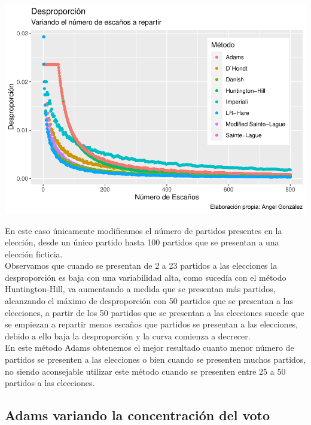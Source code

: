 \documentclass[12pt,a4paper,]{book}
\numberwithin{dummy}{section}
\theoremstyle{ocrenumbox}
\theoremstyle{blacknumex}
\theoremstyle{blacknumbox}
\theoremstyle{ocrenum}
\theoremstyle{ocrenum}
\begin{document}
\begin{center}\includegraphics[width=0.95\linewidth]{figurasR/unnamed-chunk-44-1} \end{center}

En este caso únicamente modificamos el número de partidos presentes en
la elección, desde un único partido hasta 100 partidos que se presentan
a una elección ficticia.\\
Observamos que cuando se presentan de 2 a 23 partidos a las elecciones
la desproporción es baja con una variabilidad alta, como sucedía con el
método Huntington-Hill, va aumentando a medida que se presentan más
partidos, alcanzando el máximo de desproporción con 50 partidos que se
presentan a las elecciones, a partir de los 50 partidos que se presentan
a las elecciones sucede que se empiezan a repartir menos escaños que
partidos se presentan a las elecciones, debido a ello baja la
desproporción y la curva comienza a decrecer.\\
En este método Adams obtenemos el mejor resultado cuanto menor número de
partidos se presenten a las elecciones o bien cuando se presenten muchos
partidos, no siendo aconsejable utilizar este método cuando se presenten
entre 25 a 50 partidos a las elecciones.

\hypertarget{adams-variando-la-concentraciuxf3n-del-voto}{%
\subsection{Adams variando la concentración del
voto}\label{adams-variando-la-concentraciuxf3n-del-voto}}
\end{document}
